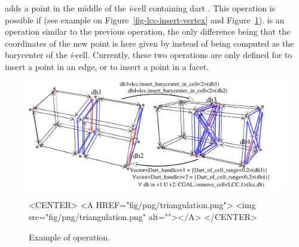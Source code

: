 adds a point
in the middle of the \emph{i}-cell containing dart . This
operation is possible if \myin{} (see example
on Figure~\ref{fig-lcc-insert-vertex} and
Figure~\ref{fig-lcc-triangulate}).  
 is an 
operation similar to the previous operation, the only difference being
that the coordinates of the new point is here given by  instead
of being computed as the barycenter of the \emph{i}-cell.  Currently,
these two operations are only defined for  to insert a point
in an edge, or  to insert a point in a facet.
%
\begin{figure}[htb]
  \begin{ccTexOnly}
    \centerline{\includegraphics[width=.85\textwidth]
      {Linear_cell_complex/fig/pdf/triangulation}}
  \end{ccTexOnly}
  \begin{ccHtmlOnly}
    <CENTER> <A HREF="fig/png/triangulation.png"> <img
    src="fig/png/triangulation.png" alt=""></A> </CENTER>
  \end{ccHtmlOnly}
  \caption{Example of  operation.}
  \label{fig-lcc-triangulate}
\end{figure}
%

